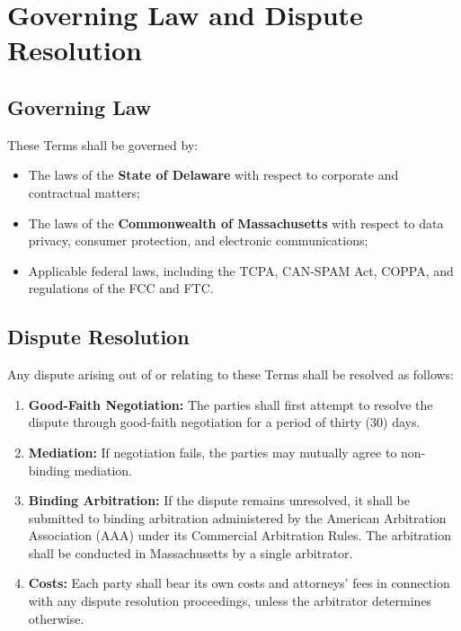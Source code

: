 \documentclass[11pt,letterpaper,parskip=half]{scrartcl}
\begin{document}
\section{Governing Law and Dispute Resolution}

\subsection{Governing Law}

These Terms shall be governed by:

\begin{itemize}[nosep, leftmargin=1.5em]
    \item The laws of the \textbf{State of Delaware} with respect to corporate and contractual matters;
    \item The laws of the \textbf{Commonwealth of Massachusetts} with respect to data privacy, consumer protection, and electronic communications;
    \item Applicable federal laws, including the TCPA, CAN-SPAM Act, COPPA, and regulations of the FCC and FTC.
\end{itemize}

\subsection{Dispute Resolution}

Any dispute arising out of or relating to these Terms shall be resolved as follows:

\begin{enumerate}[nosep, leftmargin=1.5em]
    \item \textbf{Good-Faith Negotiation:} The parties shall first attempt to resolve the dispute through good-faith negotiation for a period of thirty (30) days.
    \item \textbf{Mediation:} If negotiation fails, the parties may mutually agree to non-binding mediation.
    \item \textbf{Binding Arbitration:} If the dispute remains unresolved, it shall be submitted to binding arbitration administered by the American Arbitration Association (AAA) under its Commercial Arbitration Rules. The arbitration shall be conducted in Massachusetts by a single arbitrator.
    \item \textbf{Costs:} Each party shall bear its own costs and attorneys' fees in connection with any dispute resolution proceedings, unless the arbitrator determines otherwise.
\end{enumerate}
\end{document}
